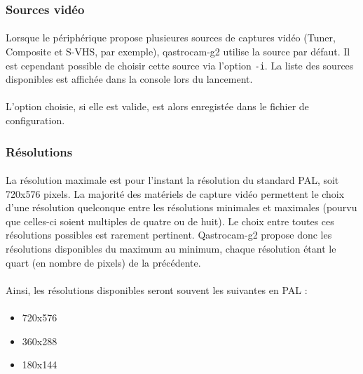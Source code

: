 \documentclass[11pt,a4paper]{book}
\begin{document}
\subsubsection{Sources vid\'eo}

\paragraph*{}
Lorsque le p\'eriph\'erique propose plusieures sources de captures vid\'eo (Tuner, Composite et
S-VHS, par exemple), qastrocam-g2 utilise la source par d\'efaut. Il est cependant possible de
choisir cette source via l'option {\tt -i}. La liste des sources disponibles est affich\'ee dans
la console lors du lancement.

\paragraph*{}
L'option choisie, si elle est valide, est alors enregist\'ee dans le fichier de configuration.

\subsubsection{R\'esolutions}

\paragraph*{}
La r\'esolution maximale est pour l'instant la r\'esolution du standard PAL, soit 720x576 pixels.
La majorit\'e des mat\'eriels de capture vid\'eo permettent le choix d'une r\'esolution quelconque
entre les r\'esolutions minimales et maximales (pourvu que celles-ci soient multiples de quatre ou
de huit). Le choix entre toutes ces r\'esolutions possibles est rarement pertinent. Qastrocam-g2
propose donc les r\'esolutions disponibles du maximum au minimum, chaque r\'esolution \'etant
le quart (en nombre de pixels) de la pr\'ec\'edente.

\paragraph*{}
Ainsi, les r\'esolutions disponibles seront souvent les suivantes en PAL :

\paragraph*{}
\begin{itemize}
\item 720x576
\item 360x288
\item 180x144
\end{itemize}
\end{document}
